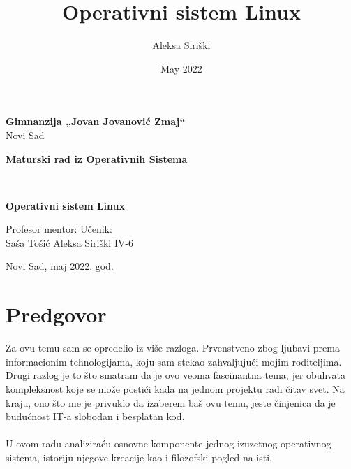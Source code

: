\documentclass[a4paper,14pt]{article}
\title{Operativni sistem Linux}
\author{Aleksa Siriški}
\date{May 2022}
\begin{document}
\pagestyle{empty}
\begin{center}
\textbf{Gimnanzija „Jovan Jovanović Zmaj“}
\\
Novi Sad
\end{center}
\vfill
\begin{center}
	\begin{large}
		\textbf{Maturski rad iz Operativnih Sistema}
		\bigskip 
	\end{large}
	\\
	\begin{huge}
        \textbf{Operativni sistem Linux}
	\end{huge}
\end{center}
\vfill
\begin{normalsize}
Profesor mentor:
\hfill
Učenik:
\\
Saša Tošić
\hfill
Aleksa Siriški IV-6
\end{normalsize}
\vfill
\begin{center}
Novi Sad, maj 2022. god.
\end{center}
\newpage

\pagestyle{plain}
\section{Predgovor}
Za ovu temu sam se opredelio iz više razloga. Prvenstveno zbog ljubavi prema informacionim tehnologijama, koju sam stekao zahvaljujući mojim roditeljima. Drugi razlog je to što smatram da je ovo veoma fascinantna tema, jer obuhvata kompleksnost koje se može postići kada na jednom projektu radi čitav svet. Na kraju, ono što me je privuklo da izaberem baš ovu temu, jeste činjenica da je budućnost IT-a slobodan i besplatan kod.
\\\\
U ovom radu analiziraću osnovne komponente jednog izuzetnog operativnog sistema, istoriju njegove kreacije kao i filozofski pogled na isti.
\newpage

\renewcommand{\contentsname}{Sadržaj}
\tableofcontents
\newpage

\pagestyle{fancy}
\fancyhf{}
\cfoot{\thepage}
\end{document}
